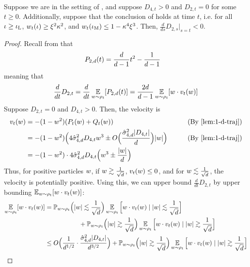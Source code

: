 \begin{lemma} \label{lemma:phase3_case2_fixedB}
Suppose we are in the setting of , and suppose $D_{4, t} > 0$ and $D_{2, t} = 0$ for some $t \geq 0$. Additionally, suppose that the conclusion of  holds at time $t$, i.e. for all $\iota \geq \iota_{\textup{L}}$, $w_t(\iota) \geq \xi^2 \kappa^2$, and $w_t(\iota_{\textup{M}}) \leq 1 - \kappa^4 \xi^3$. Then, $\frac{d}{ds} D_{2, s} \big|_{s = t} < 0$.
\end{lemma}
\begin{proof}
Recall from  that
\begin{align}
{P_{2, d}}(t)
& = \frac{d}{d - 1} t^2 - \frac{1}{d - 1}
\end{align}
meaning that
\begin{align}
\frac{d}{dt} D_{2, t}
 = \frac{d}{dt} \operatorname*{\mathbb{E}}_{w \sim \rho_t} [{P_{2, d}}(t)]
 = \frac{2d}{d - 1} \operatorname*{\mathbb{E}}_{w \sim \rho_t} [w \cdot v_t(w)]
\end{align}
Suppose $D_{2, t} = 0$ and $D_{4, t} > 0$. Then, the velocity is
\begin{align}
\vel_t(\w)
& = -(1 - \w^2) (P_t(\w) + Q_t(\w)) 
& \tag{By \Cref{lem:1-d-traj}} \\
& = -(1 - \w^2) \Big(4 \sigmaCoeffFour^2 D_{4, t} \w^3 \pm O\Big(\frac{\sigmaCoeffFour^2 |D_{4, t}|}{d}\Big) |\w| \Big)
& \tag{By \Cref{lem:1-d-traj}} \\
& = -(1 - \w^2) \cdot 4 \sigmaCoeffFour^2 D_{4, t} \Big(\w^3 \pm \frac{|\w|}{d}\Big) \label{eq:d2_0_d4>0_vel_bound}
\end{align}
Thus, for positive particles $w$, if $w \gtrsim \frac{1}{\sqrt{d}}$, $v_t(w) \leq 0$, and for $w \lesssim \frac{1}{\sqrt{d}}$, the velocity is potentially positive. Using this, we can upper bound $\frac{d}{dt} D_{2, t}$ by upper bounding $\operatorname*{\mathbb{E}}_{w \sim \rho_t}[w \cdot v_t(w)]$:
\begin{align}
\E_{\w \sim \rho_t}[\w \cdot \vel_t(\w)]
& = \Prob_{\w \sim \rho_t}\Big(|\w| \lesssim \frac{1}{\sqrt{d}}\Big) \E_{\w \sim \rho_t}\Big[\w \cdot \vel_t(\w) \mid |\w| \lesssim \frac{1}{\sqrt{d}} \Big] \\
& \nextlinespace\nextlinespace + \Prob_{\w \sim \rho_t} \Big(|\w| \gtrsim \frac{1}{\sqrt{d}}\Big) \E_{\w \sim \rho_t}\Big[\w \cdot \vel_t(\w) \mid |\w| \gtrsim \frac{1}{\sqrt{d}}\Big] \\
& \leq O\Big(\frac{1}{d^{1/2}} \cdot \frac{\sigmaCoeffFour^2 |D_{4, t}|}{d^{3/2}}\Big) + \Prob_{\w \sim \rho_t} \Big(|\w| \gtrsim \frac{1}{\sqrt{d}}\Big) \E_{\w \sim \rho_t}\Big[\w \cdot \vel_t(\w) \mid |\w| \gtrsim \frac{1}{\sqrt{d}}\Big]

\end{align}
\end{proof}
